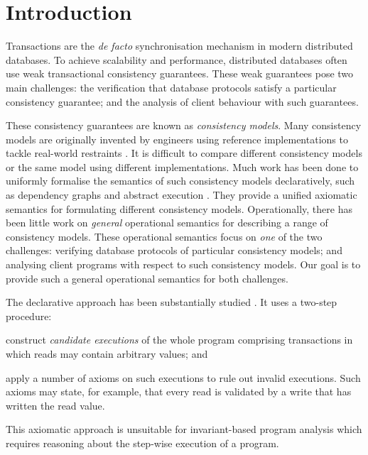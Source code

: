 \section{Introduction}
\label{sec:intro}

Transactions are the \emph{de facto} synchronisation mechanism in
modern distributed databases.  To achieve scalability and performance,
distributed databases often use weak transactional consistency
guarantees. These weak guarantees pose two main challenges: the
verification that database protocols satisfy a particular consistency
guarantee; and the analysis of client behaviour with such guarantees.

These consistency guarantees are known as \emph{consistency models}.
Many consistency models are originally invented by engineers
using reference implementations to tackle real-world restraints \cite{tango,CORFU,ramp,rola,cops,wren,redblue,PSI,NMSI,gdur,clocksi,distrsi,PSI-RA,si}.
It is difficult to compare different consistency models or the same model using different implementations.
Much work has been done to uniformly formalise the semantics of such consistency models declaratively,
such as dependency graphs \cite{adya} and abstract execution \cite{ev_transactions}.
They provide a unified axiomatic semantics for formulating different consistency models.
Operationally, there has been little work on \emph{general} operational semantics
for describing a range of consistency models.
These operational semantics focus on \emph{one} of the two challenges:
verifying database protocols of particular consistency models;
and analysing client programs with respect to such consistency models.  
Our goal is to provide such a general operational semantics for both challenges.

The declarative approach has been substantially
studied \cite{adya,ev_transactions,framework-concur,laws}. 
It uses a two-step procedure:
\begin{enumerate*}
\item construct {\em candidate executions} of the whole program comprising
transactions in which reads may contain arbitrary values; and 
\item apply a number of axioms on such executions to rule out invalid executions. 
Such axioms may state, for example, that every read is
validated by a write that has written the read value. 
\end{enumerate*}
This axiomatic approach is unsuitable for invariant-based program analysis 
which requires reasoning about the step-wise execution of a program. 

